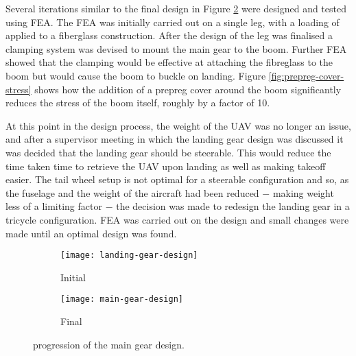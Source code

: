 \documentclass[../../main.tex]{subfiles}
\begin{document}
Several iterations similar to the final design in Figure \ref{fig:main-gear-progression:final} were designed and tested using FEA.
The FEA was initially carried out on a single leg, with a loading of  applied to a fiberglass construction.
After the design of the leg was finalised a clamping system was devised to mount the main gear to the boom.
Further FEA showed that the clamping would be effective at attaching the fibreglass to the boom but would cause the boom to buckle on landing.
Figure \ref{fig:prepreg-cover-stress} shows how the addition of a prepreg cover around the boom significantly reduces the stress of the boom itself, roughly by a factor of 10. 


At this point in the design process, the weight of the UAV was no longer an issue, and after a supervisor meeting in which the landing gear design was discussed it was decided that the landing gear should be steerable.
This would reduce the time taken time to retrieve the UAV upon landing as well as making takeoff easier.
The tail wheel setup is not optimal for a steerable configuration and so, as the fuselage and the weight of the aircraft had been reduced $-$ making weight less of a limiting factor $-$ the decision was made to redesign the landing gear in a tricycle configuration. 
FEA was carried out on the design and small changes were made until an optimal design was found.

\begin{figure}[H]
    \centering
    \begin{subfigure}[b]{0.33\columnwidth}
        \centering
        \texttt{[image: landing-gear-design]}
        \caption{Initial}
        \label{fig:main-gear-progression:initial}
    \end{subfigure}
    \hfill
    \begin{subfigure}[b]{0.49\columnwidth}
        \centering
        \texttt{[image: main-gear-design]}
        \caption{Final}
        \label{fig:main-gear-progression:final}
    \end{subfigure}
    
    \caption{progression of the main gear design.}
    \label{fig:main-gear-progression}
\end{figure}
\end{document}
